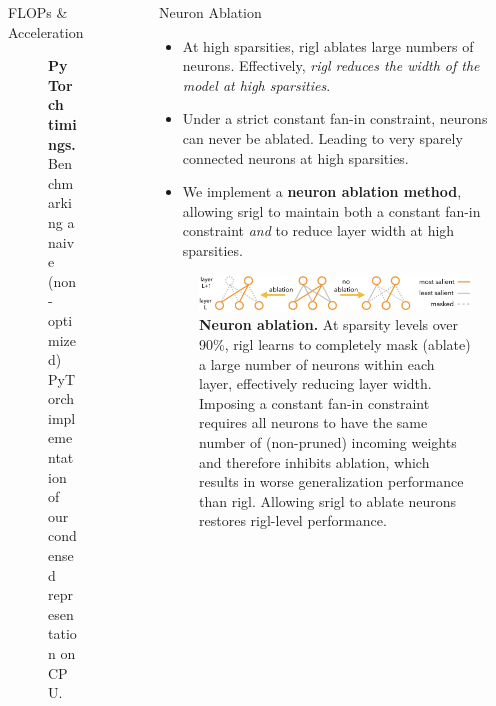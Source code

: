 \documentclass[final]{beamer}
\newlength{\sepwidth}
\newlength{\colwidth}
\newcommand{\separatorcolumn}{\begin{column}{\sepwidth}\end{column}}
\begin{document}
\begin{frame}[t]
\begin{columns}[t]
\begin{column}{\colwidth}
\begin{block}{FLOPs \& Acceleration}
\begin{figure}
\begin{minipage}[t]{.49\colwidth}
        \caption{\textbf{PyTorch timings.} Benchmarking a naive (non-optimized) PyTorch implementation of our condensed  representation on CPU.}\label{fig:CPUbenchm}
    \end{minipage}
\end{figure}
\end{block}
\end{column}

\separatorcolumn

\begin{column}{\colwidth}

  \begin{block}{Neuron Ablation}
    \begin{itemize}
        \item At high sparsities, \gls{rigl} ablates large numbers of neurons. Effectively, \emph{\gls{rigl} reduces the width of the model at high sparsities}.
        \item Under a strict constant fan-in constraint, neurons can never be ablated. Leading to very sparely connected neurons at high sparsities.
        \item We implement a \textbf{neuron ablation method}, allowing \gls{srigl} to maintain both a constant fan-in constraint \emph{and} to reduce layer width at high sparsities.
    \end{itemize}

\begin{figure}
    \centering
    \includegraphics[width=\colwidth]{srigl_example_figs/ablationvsnoablation_wide.pdf}
     \caption{\textbf{Neuron ablation.} At sparsity levels over 90\%, \gls{rigl} learns to completely mask (ablate) a large number of neurons within each layer, effectively reducing layer width. Imposing a constant fan-in constraint requires all neurons to have the same number of (non-pruned) incoming weights and therefore inhibits ablation, which results in worse generalization performance than \gls{rigl}. Allowing \gls{srigl} to ablate neurons  restores \gls{rigl}-level performance.}\label{fig:ablationvsnoablation}
\end{figure}


\end{block}
\end{column}
\end{columns}
\end{frame}
\end{document}
